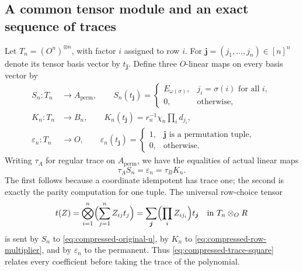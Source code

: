 \subsection{A common tensor module and an exact sequence of traces}

Let $T_n=(O^n)^{\otimes n}$, with factor $i$ assigned to row $i$.
For $\boldsymbol j=(j_1,\ldots,j_n)\in[n]^n$ denote its tensor
basis vector by $t_{\boldsymbol j}$. Define three $O$-linear maps
on every basis vector by
\[
 \begin{split}
 S_n:T_n&\longrightarrow A_{\mathrm{perm}},\qquad
 S_n(t_{\boldsymbol j})=
 \begin{cases}E_{\omega(\sigma)},&j_i=\sigma(i)\text{ for all }i,\\
 0,&\text{otherwise},\end{cases}\\
 K_n:T_n&\longrightarrow B_n,\qquad
 K_n(t_{\boldsymbol j})=r_n^{-1}\chi_n\prod_i d_{j_i},\\
 \varepsilon_n:T_n&\longrightarrow O,\qquad
 \varepsilon_n(t_{\boldsymbol j})=
 \begin{cases}1,&\boldsymbol j\text{ is a permutation tuple},\\
 0,&\text{otherwise}.\end{cases}
 \end{split}
\]
Writing $\tau_A$ for regular trace on $A_{\mathrm{perm}}$, we have
the equalities of actual linear maps
\begin{equation}\label{eq:compressed-trace-square}
 \tau_AS_n=\varepsilon_n=\tau_BK_n.
\end{equation}
The first follows because a coordinate idempotent has trace one;
the second is exactly the parity computation for one tuple.
The universal row-choice tensor
\[
 t(Z)=\bigotimes_{i=1}^n\Bigl(\sum_{j=1}^n Z_{ij}t_j\Bigr)
     =\sum_{\boldsymbol j}\Bigl(\prod_i Z_{ij_i}\Bigr)t_{\boldsymbol j}
 \quad\text{in }T_n\otimes_O R
\]
is sent by $S_n$ to \eqref{eq:compressed-original-u}, by $K_n$
to \eqref{eq:compressed-row-multiplier}, and by $\varepsilon_n$
to the permanent. Thus \eqref{eq:compressed-trace-square} relates
every coefficient before taking the trace of the polynomial.


